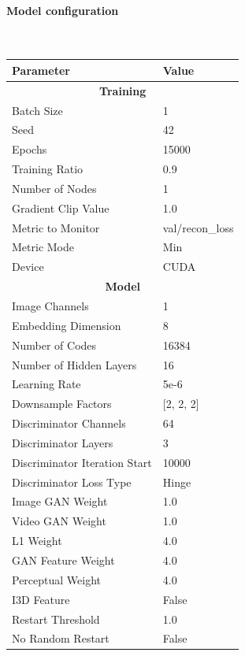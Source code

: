 \paragraph{Model configuration}\mbox{}\\
\begin{table}[H]
\centering
\begin{tabular}{|l|l|}
\hline
\textbf{Parameter} & \textbf{Value} \\
\hline
\multicolumn{2}{|c|}{\textbf{Training}} \\
\hline
Batch Size & 1 \\
\hline
Seed & 42 \\
\hline
Epochs & 15000 \\
\hline
Training Ratio & 0.9 \\
\hline
Number of Nodes & 1 \\
\hline
Gradient Clip Value & 1.0 \\
\hline
Metric to Monitor & val/recon\_loss \\
\hline
Metric Mode & Min \\
\hline
Device & CUDA \\
\hline
\multicolumn{2}{|c|}{\textbf{Model}} \\
\hline
Image Channels & 1 \\
\hline
Embedding Dimension & 8 \\
\hline
Number of Codes & 16384 \\
\hline
Number of Hidden Layers & 16 \\
\hline
Learning Rate & 5e-6 \\
\hline
Downsample Factors & [2, 2, 2] \\
\hline
Discriminator Channels & 64 \\
\hline
Discriminator Layers & 3 \\
\hline
Discriminator Iteration Start & 10000 \\
\hline
Discriminator Loss Type & Hinge \\
\hline
Image GAN Weight & 1.0 \\
\hline
Video GAN Weight & 1.0 \\
\hline
L1 Weight & 4.0 \\
\hline
GAN Feature Weight & 4.0 \\
\hline
Perceptual Weight & 4.0 \\
\hline
I3D Feature & False \\
\hline
Restart Threshold & 1.0 \\
\hline
No Random Restart & False \\

\end{tabular}
\end{table}
